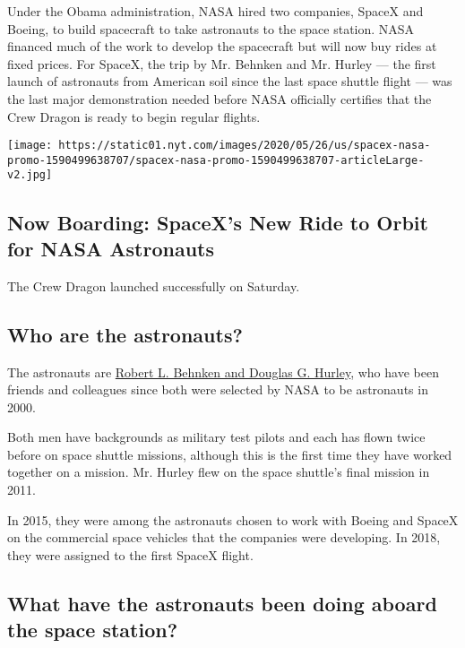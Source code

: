 Under the Obama administration, NASA hired two companies, SpaceX and
Boeing, to build spacecraft to take astronauts to the space station.
NASA financed much of the work to develop the spacecraft but will now
buy rides at fixed prices. For SpaceX, the trip by Mr. Behnken and Mr.
Hurley --- the first launch of astronauts from American soil since the
last space shuttle flight --- was the last major demonstration needed
before NASA officially certifies that the Crew Dragon is ready to begin
regular flights.

\href{https://www.nytimes.com/interactive/2020/05/26/science/spacex-nasa.html}{}

\texttt{[image: https://static01.nyt.com/images/2020/05/26/us/spacex-nasa-promo-1590499638707/spacex-nasa-promo-1590499638707-articleLarge-v2.jpg]}

\hypertarget{now-boarding-spacexs-new-ride-to-orbit-for-nasa-astronauts}{%
\subsection{Now Boarding: SpaceX's New Ride to Orbit for NASA
Astronauts}\label{now-boarding-spacexs-new-ride-to-orbit-for-nasa-astronauts}}

The Crew Dragon launched successfully on Saturday.

\hypertarget{who-are-the-astronauts}{%
\subsection{Who are the astronauts?}\label{who-are-the-astronauts}}

The astronauts are
\href{https://www.nytimes.com/2020/05/27/science/bob-behnken-doug-hurley.html}{Robert
L. Behnken and Douglas G. Hurley}, who have been friends and colleagues
since both were selected by NASA to be astronauts in 2000.

Both men have backgrounds as military test pilots and each has flown
twice before on space shuttle missions, although this is the first time
they have worked together on a mission. Mr. Hurley flew on the space
shuttle's final mission in 2011.

In 2015, they were among the astronauts chosen to work with Boeing and
SpaceX on the commercial space vehicles that the companies were
developing. In 2018, they were assigned to the first SpaceX flight.

\hypertarget{what-have-the-astronauts-been-doing-aboard-the-space-station}{%
\subsection{What have the astronauts been doing aboard the space
station?}\label{what-have-the-astronauts-been-doing-aboard-the-space-station}}

